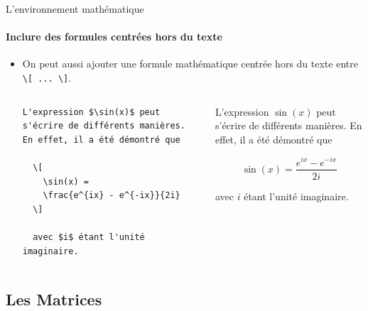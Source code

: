 \begin{frame}[fragile]{L'environnement mathématique}
  \framesubtitle{Inclure des formules centrées hors du texte}
  \begin{itemize}
  \item On peut aussi ajouter une formule mathématique centrée hors du texte entre \lstinline|\[ ... \]|.
  \vspace{0.5cm}
  \begin{columns}
    \begin{column}{0.45\textwidth}
      \begin{lstlisting}[style = nonumbers]
  L'expression $\sin(x)$ peut s'écrire de différents manières. En effet, il a été démontré que

  \[
    \sin(x) =
    \frac{e^{ix} - e^{-ix}}{2i}
  \]

  avec $i$ étant l'unité imaginaire.
      \end{lstlisting}
    \end{column}
    \begin{column}{0.45\textwidth}
      L'expression $\sin(x)$ peut s'écrire de différents manières. En effet, il a été démontré que

      \[ \sin(x) = \frac{e^{ix} - e^{-ix}}{2i} \]

      avec $i$ étant l'unité imaginaire.
    \end{column}
  \end{columns}
  \end{itemize}
\end{frame}

\subsection{Les Matrices}

